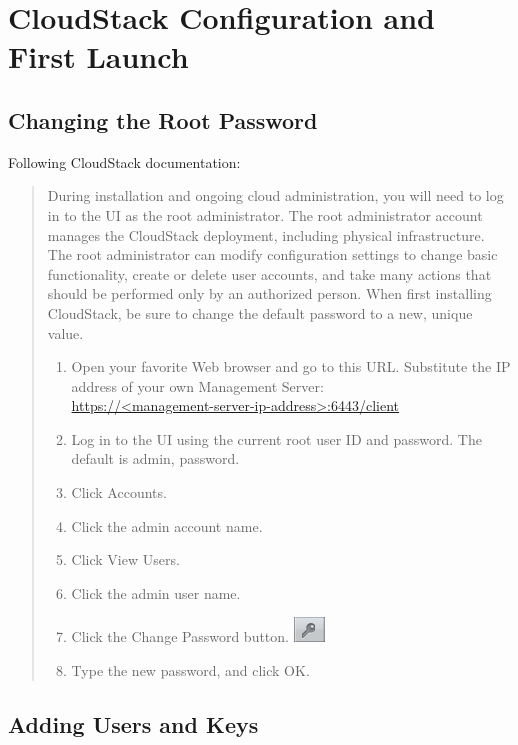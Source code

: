 \chapter{CloudStack Configuration and First Launch}
\label{cpt:config}

\section{Changing the Root Password}
\label{sct:config:passwd}

Following CloudStack documentation:
\begin{quote}
	During installation and ongoing cloud administration, you will need to log in to the UI as the root administrator. 
	The root administrator account manages the CloudStack deployment, including physical infrastructure. 
	The root administrator can modify configuration settings to change basic functionality, create or delete user accounts, and take many actions that should be performed only by an authorized person. 
	When first installing CloudStack, be sure to change the default password to a new, unique value.
	\begin{enumerate}
		\item Open your favorite Web browser and go to this URL.
			Substitute the IP address of your own Management Server:\\
			\url{https://<management-server-ip-address>:6443/client}
		\item Log in to the UI using the current root user ID and password. 
			The default is admin, password.
		\item Click Accounts.
		\item Click the admin account name.
		\item Click View Users.
		\item Click the admin user name.
		\item Click the Change Password button. \includegraphics[height=2ex]{figures/passwd}
		\item Type the new password, and click OK.
	\end{enumerate}
\end{quote}


\section{Adding Users and Keys}
\label{sct:config:accounts}

